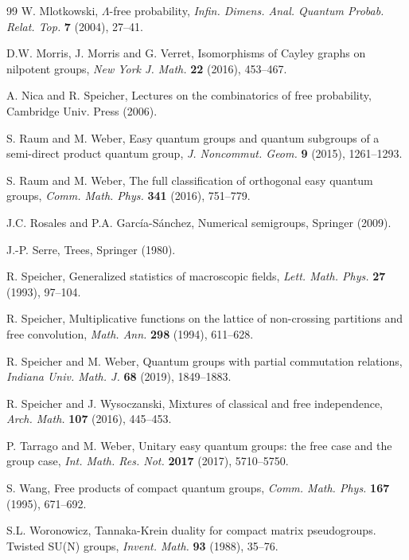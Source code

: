 \documentclass[11pt,a4paper]{article}
\begin{document}
\begin{thebibliography}{99}
 W. Mlotkowski, $\Lambda$-free probability, \emph{Infin. Dimens. Anal. Quantum Probab. Relat. Top.} \textbf{7} (2004), 27--41.

 D.W. Morris, J. Morris and G. Verret, Isomorphisms of Cayley graphs on nilpotent groups, \emph{New York J. Math.} \textbf{22} (2016), 453--467.

 A. Nica and R. Speicher, Lectures on the combinatorics of free probability, Cambridge Univ. Press (2006).

 S. Raum and M. Weber, Easy quantum groups and quantum subgroups of a semi-direct product quantum group, \emph{J. Noncommut. Geom.} \textbf{9} (2015), 1261--1293.

 S. Raum and M. Weber, The full classification of orthogonal easy quantum groups, \emph{Comm. Math. Phys.} \textbf{341} (2016), 751--779.

 J.C. Rosales and P.A. Garc\'ia-S\'anchez, Numerical semigroups, Springer (2009).

 J.-P. Serre, Trees, Springer (1980).

 R. Speicher, Generalized statistics of macroscopic fields, \emph{Lett. Math. Phys.} \textbf{27} (1993), 97--104.

 R. Speicher, Multiplicative functions on the lattice of non-crossing partitions and free convolution, \emph{Math. Ann.} \textbf{298} (1994), 611--628.

 R. Speicher and M. Weber, Quantum groups with partial commutation relations, \emph{Indiana Univ. Math. J.} \textbf{68} (2019), 1849--1883.

 R. Speicher and J. Wysoczanski, Mixtures of classical and free independence, \emph{Arch. Math.} \textbf{107} (2016), 445--453.

 P. Tarrago and M. Weber, Unitary easy quantum groups: the free case and the group case, \emph{Int. Math. Res. Not.} \textbf{2017} (2017), 5710--5750.

 S. Wang, Free products of compact quantum groups, \emph{Comm. Math. Phys.} \textbf{167} (1995), 671--692.

 S.L. Woronowicz, Tannaka-Krein duality for compact matrix pseudogroups. Twisted SU(N) groups, \emph{Invent. Math.} \textbf{93} (1988), 35--76.

\end{thebibliography}
\end{document}
